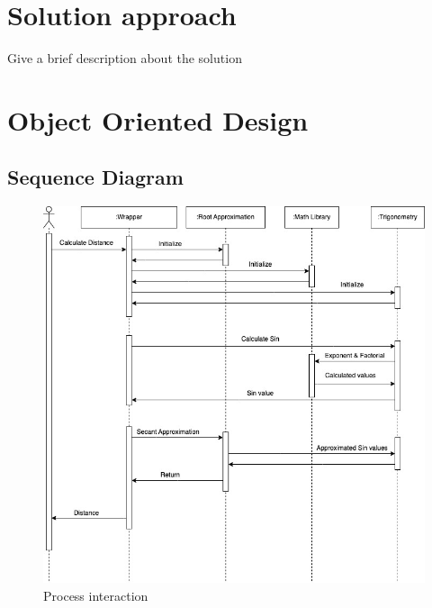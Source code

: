 \section{Solution approach}
    Give a brief description about the solution
    \pagebreak

  \section{Object Oriented Design}
    \subsection{Sequence Diagram}
      \vspace{1cm}
      \begin{figure}[h!]
        \includegraphics[width=1\linewidth]{resources/sequence.jpeg}
        \vspace{.5cm}
        \caption{Process interaction}
        \label{fig:Sequence Diagram}
      \end{figure}
      \vspace{2cm}


